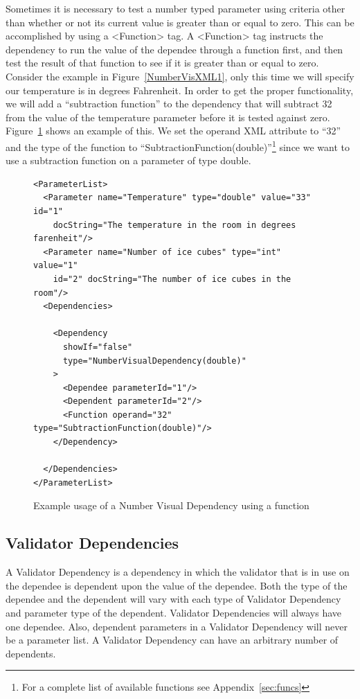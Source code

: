 Sometimes it is necessary to test a number typed parameter using criteria other than whether or not its current value is greater than or equal to zero.
This can be accomplished by using a <Function> tag. A <Function> tag instructs the dependency to run the value of the dependee through a function
first, and then test the result of that function to see if it is greater than or equal to zero. Consider the example in Figure~\ref{NumberVisXML1}, only this
time we will specify our temperature is in degrees Fahrenheit. In order to get the proper functionality, we will add a ``subtraction function'' to the dependency that will
subtract 32 from the value of the temperature parameter before it is tested against zero. Figure~\ref{NumberVisXML2} shows an example of this. We set the operand 
XML attribute to ``32'' and the type of the function to ``SubtractionFunction(double)''\footnote{For a complete list of available functions see Appendix~\ref{sec:funcs}}
 since we want to use a subtraction function on a parameter of type double.
\begin{figure}
\centering
{\footnotesize
\begin{Verbatim}
<ParameterList>
  <Parameter name="Temperature" type="double" value="33" id="1" 
    docString="The temperature in the room in degrees farenheit"/>
  <Parameter name="Number of ice cubes" type="int" value="1"
    id="2" docString="The number of ice cubes in the room"/>
  <Dependencies>

    <Dependency 
      showIf="false" 
      type="NumberVisualDependency(double)"
    >
      <Dependee parameterId="1"/>
      <Dependent parameterId="2"/>
      <Function operand="32" type="SubtractionFunction(double)"/> 
    </Dependency>

  </Dependencies>
</ParameterList>
\end{Verbatim}
}
\caption{Example usage of a Number Visual Dependency using a function}
\label{NumberVisXML2}
\end{figure}

\subsection{Validator Dependencies}
A Validator Dependency is a dependency in which the validator that is in use on the dependee is dependent upon the value of the dependee. Both the type of
the dependee and the dependent will vary with each type of Validator Dependency and parameter type of the dependent. Validator Dependencies will always have
one dependee. Also, dependent parameters in a Validator Dependency will never be a parameter list. A Validator Dependency can have an arbitrary number of 
dependents.

